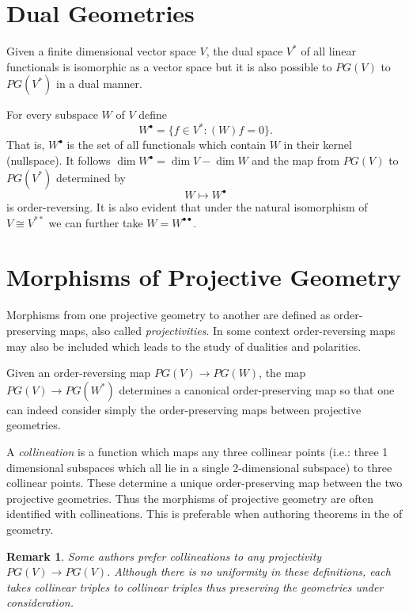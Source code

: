 \documentclass[12pt]{article}
\newtheorem{remark}[thm]{Remark}
\begin{document}
\section{Dual Geometries}

Given a finite dimensional vector space $V$, the dual space $V^*$ of all linear functionals is isomorphic as a vector space but it is also possible to  $PG(V)$ to $PG(V^*)$ in a dual manner.

For every subspace $W$ of $V$ define
\[W^\bullet =\{f\in V^*:(W)f=0\}.\]
That is, $W^\bullet$ is the set of all functionals which contain $W$ in their kernel (nullspace).  It follows $\dim W^\bullet=\dim V-\dim W$ and the map
from $PG(V)$ to $PG(V^*)$ determined by
\[W\mapsto W^\bullet\]
is order-reversing.  It is also evident that under the natural isomorphism of
$V\cong V^{**}$ we can further take $W=W^{\bullet\bullet}$.

\section{Morphisms of Projective Geometry}

Morphisms from one projective geometry to another are defined as order-preserving maps, also called \emph{projectivities}.  In some context order-reversing maps may also be included which leads to the study of dualities and polarities.  

Given an order-reversing map $PG(V)\rightarrow PG(W)$, the map $PG(V)\rightarrow PG(W^*)$ determines a canonical order-preserving map so that one can indeed consider simply the order-preserving maps between projective geometries.

A \emph{collineation} is a function which maps any three collinear points (i.e.: three 1 dimensional subspaces which all lie in a single 2-dimensional subspace) to three collinear points.  These determine a unique order-preserving map between the two projective geometries.  Thus the morphisms of projective geometry are often identified with collineations.  This  is preferable when authoring theorems in the  of geometry.

\begin{remark}
Some authors prefer collineations to  any projectivity $PG(V)\rightarrow PG(V)$.  Although there is no uniformity in these definitions, each takes collinear triples to collinear triples thus preserving the geometries under consideration.
\end{remark}
\end{document}
